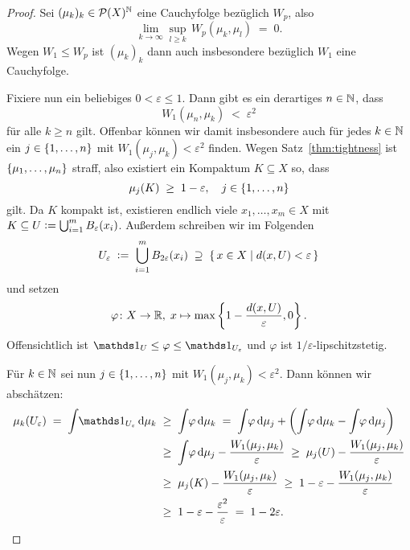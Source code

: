 \documentclass[../main/main.tex]{subfiles}
\begin{document}
	\begin{proof}
		Sei $(\mu_k)_k \in \mathcal{P}(X)^{\mathbb{N}}$ eine Cauchyfolge bezüglich $W_p$, also
		\[ \lim_{k \to \infty} \sup_{l \geq k} \, W_p(\mu_k, \mu_l) \; = \; 0 \text{.} \]
		Wegen $W_1 \leq W_p$ ist $(\mu_k)_k$ dann auch insbesondere bezüglich $W_1$ eine Cauchyfolge. 
		
		Fixiere nun ein beliebiges $0 < \varepsilon \leq 1$. Dann gibt es ein derartiges $n \in \mathbb{N}$, dass 
		\[ W_1(\mu_n, \mu_k) \; < \; \varepsilon^2 \]
		für alle $k \geq n$ gilt. Offenbar können wir damit insbesondere auch für jedes $k \in \mathbb{N}$ ein $j \in \left\{1, \dots, n\right\}$ mit
		$W_1(\mu_j, \mu_k) < \varepsilon^2$ finden. Wegen Satz~\ref{thm:tightness} ist $\left\{\mu_1, \dots, \mu_n\right\}$ straff, also existiert ein Kompaktum
		$K \subseteq X$ so, dass
		\[ \mu_j(K) \; \geq \; 1 - \varepsilon, \quad j \in \left\{1, \dots, n\right\} \]
		gilt. Da $K$ kompakt ist, existieren endlich viele $x_1, \dots, x_m \in X$ mit 
		$K \subseteq U \vcentcolon = \bigcup_{i=1}^{m} B_{\varepsilon}(x_i)$.
		Außerdem schreiben wir im Folgenden 
		\[ U_{\varepsilon} \; \vcentcolon = \; \bigcup_{i=1}^{m} B_{2\varepsilon}(x_i) \; \supseteq \; \left\{\, x \in X \; \middle| \; d(x, U) < \varepsilon \,\right\} \] 
		und setzen 
		\[ \varphi \colon X \to \mathbb{R}, \; x \mapsto \max \left\{1-\frac{d(x, U)}{\varepsilon}, 0 \right\}  \text{.} \]
		Offensichtlich ist $\indfct_U \leq \varphi \leq \indfct_{U_\varepsilon}$ und $\varphi$ ist $1/\varepsilon$-lipschitzstetig.
		
		Für  $k \in \mathbb{N}$ sei nun $j \in \left\{1, \dots, n\right\}$ mit $W_1(\mu_j, \mu_k) < \varepsilon^2$. Dann können wir abschätzen:
		\begin{align*}
			\mu_k(U_\varepsilon) \; = \; \measureint{}{\indfct_{U_\varepsilon}}{\mu_k} \; &\geq \; \measureint{}{\varphi}{\mu_k} \; = \; \measureint{}{\varphi}{\mu_j} + \left( \measureint{}{\varphi}{\mu_k} - \measureint{}{\varphi}{\mu_j} \right) \\
			                                                                              &\geq \; \measureint{}{\varphi}{\mu_j} - \frac{W_1(\mu_j, \mu_k)}{\varepsilon} \; \geq \; \mu_j(U) - \frac{W_1(\mu_j, \mu_k)}{\varepsilon} \\
			                                                                              &\geq \; \mu_j(K) - \frac{W_1(\mu_j, \mu_k)}{\varepsilon} \; \geq \; 1 - \varepsilon - \frac{W_1(\mu_j, \mu_k)}{\varepsilon} \\
			                                                                              &\geq \; 1 - \varepsilon - \frac{\varepsilon^2}{\varepsilon} \; = \; 1 - 2\varepsilon \text{.}
		\end{align*}
		

\end{proof}
\end{document}
